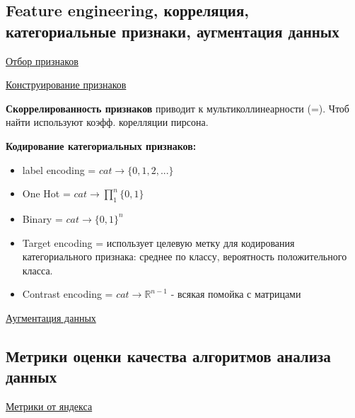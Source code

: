 \documentclass{article}
\begin{document}
\subsection{Feature engineering, корреляция, категориальные признаки, аугментация данных}

\href{
	https://neerc.ifmo.ru/wiki/index.php?title=%
}{Отбор признаков}

\href{
	https://ru.wikipedia.org/wiki/%
}{Конструирование признаков}

\textbf{Скоррелированность признаков} приводит к мультиколлинеарности (=).
Чтоб найти используют коэфф. корелляции пирсона.


\textbf{Кодирование категориальных признаков:}
\begin{itemize}
	\item label encoding = $cat \to \{0, 1, 2, ...\}$
	\item One Hot = $cat \to \prod\limits_1^n \{0, 1\}$
	\item Binary = $cat \to \{0, 1\}^n$
	\item Target encoding = использует целевую метку для кодирования
	категориального признака: среднее по классу, вероятность положительного
	класса.
	\item Contrast encoding = $cat \to \mathbb{R}^{n-1}$ - всякая помойка
	с матрицами
\end{itemize}

\href{
	https://neerc.ifmo.ru/wiki/index.php?title=%
}{Аугментация данных}


\subsection{Метрики оценки качества алгоритмов анализа данных}

\href{
	https://ml-handbook.ru/chapters/model_evaluation/intro#%
}{Метрики от яндекса}
\end{document}
